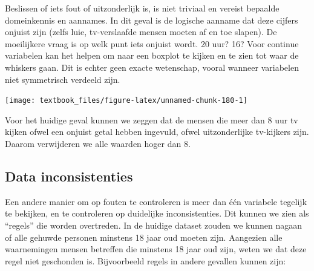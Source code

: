 \documentclass[]{tufte-book}
\newenvironment{Shaded}{}{}
\newcommand{\DataTypeTok}[1]{\textcolor[rgb]{0.56,0.13,0.00}{#1}}
\newcommand{\DecValTok}[1]{\textcolor[rgb]{0.25,0.63,0.44}{#1}}
\newcommand{\KeywordTok}[1]{\textcolor[rgb]{0.00,0.44,0.13}{\textbf{#1}}}
\newcommand{\NormalTok}[1]{#1}
\newcommand{\OperatorTok}[1]{\textcolor[rgb]{0.40,0.40,0.40}{#1}}
\newcommand{\OtherTok}[1]{\textcolor[rgb]{0.00,0.44,0.13}{#1}}
\newcommand{\StringTok}[1]{\textcolor[rgb]{0.25,0.44,0.63}{#1}}
\begin{document}
Beslissen of iets fout of uitzonderlijk is, is niet triviaal en vereist bepaalde domeinkennis en aannames. In dit geval is de logische aanname dat deze cijfers onjuist zijn (zelfs luie, tv-verslaafde mensen moeten af en toe slapen). De moeilijkere vraag is op welk punt iets onjuist wordt. 20 uur? 16? Voor continue variabelen kan het helpen om naar een boxplot te kijken en te zien tot waar de whiskers gaan. Dit is echter geen exacte wetenschap, vooral wanneer variabelen niet symmetrisch verdeeld zijn.

\begin{Shaded}
\end{Shaded}

\texttt{[image: textbook\_files/figure-latex/unnamed-chunk-180-1]}

Voor het huidige geval kunnen we zeggen dat de mensen die meer dan 8 uur tv kijken ofwel een onjuist getal hebben ingevuld, ofwel uitzonderlijke tv-kijkers zijn. Daarom verwijderen we alle waarden hoger dan 8.

\begin{Shaded}
\end{Shaded}

\hypertarget{data-inconsistenties}{%
\subsection{Data inconsistenties}\label{data-inconsistenties}}

Een andere manier om op fouten te controleren is meer dan één variabele tegelijk te bekijken, en te controleren op duidelijke inconsistenties. Dit kunnen we zien als ``regels'' die worden overtreden. In de huidige dataset zouden we kunnen nagaan of alle gehuwde personen minstens 18 jaar oud moeten zijn. Aangezien alle waarnemingen mensen betreffen die minstens 18 jaar oud zijn, weten we dat deze regel niet geschonden is.
Bijvoorbeeld regels in andere gevallen kunnen zijn:
\end{document}
